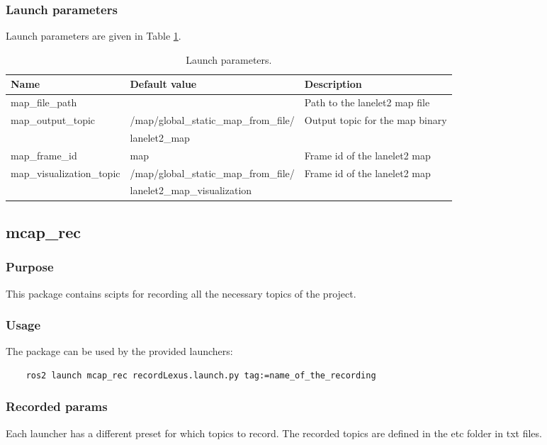 \documentclass[sn-mathphys-num]{sn-jnl}%
\begin{document}
\subsubsection{Launch parameters}
Launch parameters are given in Table \ref{tab:lanelet_handler}.
\begin{table}[!h]
    \centering
    \captionsetup{justification=centering}
    \normalsize
    \caption{\label{tab:lanelet_handler} Launch parameters.}
    \begin{tabular}{| l | l | l |}
        \hline
        \textbf{Name} & \textbf{Default value} & \textbf{Description} \\
        \hline
        map\_file\_path           &                                       & Path to the lanelet2 map file \\
        \hline
        map\_output\_topic        & /map/global\_static\_map\_from\_file/ & Output topic for the map binary \\
                                  & lanelet2\_map                         &  \\
        \hline
        map\_frame\_id            & map                                   & Frame id of the lanelet2 map \\
        \hline
        map\_visualization\_topic & /map/global\_static\_map\_from\_file/ & Frame id of the lanelet2 map \\
                                  & lanelet2\_map\_visualization          &  \\
        \hline
    \end{tabular}
\end{table}


\subsection{mcap\_rec}
\subsubsection{Purpose}
This package contains scipts for recording all the necessary topics of the project.
\subsubsection{Usage}
The package can be used by the provided launchers:
\begin{lstlisting}
    ros2 launch mcap_rec recordLexus.launch.py tag:=name_of_the_recording
\end{lstlisting}
\subsubsection{Recorded params}
Each launcher has a different preset for which topics to record. The recorded topics are defined in the etc folder in txt files.
\end{document}
